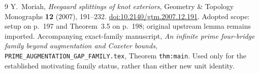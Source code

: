\documentclass[11pt]{article}
\begin{document}
\begin{thebibliography}{9}
 Y.~Moriah,
\emph{Heegaard splittings of knot exteriors},
Geometry \& Topology Monographs \textbf{12} (2007), 191--232.
\href{https://doi.org/10.2140/gtm.2007.12.191}{doi:10.2140/gtm.2007.12.191}.
Adopted scope: setup on p.~197 and Theorem~3.5 on p.~198;
original upstream lemma remains imported.
 Accompanying exact-family manuscript,
\emph{An infinite prime four-bridge family beyond augmentation and
Coxeter bounds}, \texttt{PRIME\_AUGMENTATION\_GAP\_FAMILY.tex},
Theorem \texttt{thm:main}. Used only for the established motivating
family status, rather than either new unit identity.
\end{thebibliography}
\end{document}

